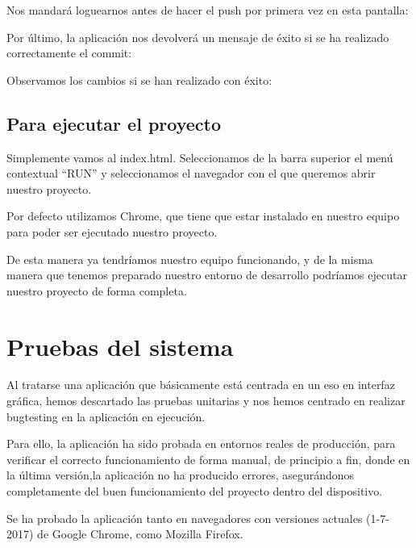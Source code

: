 Nos mandará loguearnos antes de hacer el push por primera vez en esta pantalla:

Por último, la aplicación nos devolverá un mensaje de éxito si se ha realizado correctamente el commit:

Observamos los cambios si se han realizado con éxito:

\subsection{Para ejecutar el proyecto} 
Simplemente vamos al index.html. Seleccionamos de la barra superior el menú contextual “RUN” y seleccionamos el navegador con el que queremos abrir nuestro proyecto.

Por defecto utilizamos Chrome, que tiene que estar instalado en nuestro equipo para poder ser ejecutado nuestro proyecto.

De esta manera ya tendríamos nuestro equipo funcionando, y de la misma manera que tenemos preparado nuestro entorno de desarrollo podríamos ejecutar nuestro proyecto de forma completa.

\section{Pruebas del sistema}

Al tratarse una aplicación que básicamente está centrada en un eso en interfaz gráfica, hemos descartado las pruebas unitarias y nos hemos centrado en realizar bugtesting en la aplicación en ejecución.

Para ello, la aplicación ha sido probada en entornos reales de producción, para verificar el correcto funcionamiento de forma  manual, de principio a fin, donde en la última versión,la aplicación no ha producido errores, asegurándonos completamente del buen funcionamiento del proyecto dentro del dispositivo.

Se ha probado la aplicación tanto en navegadores con versiones actuales (1-7-2017) de Google Chrome, como Mozilla Firefox.


